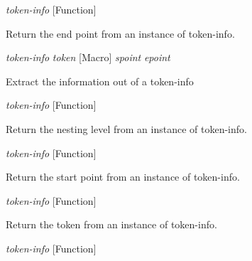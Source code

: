 \vspace{1em}
\noindent
{}
\usebox{\funcname}\emph{token-info}
 \hfill [Function]

\begin{doc-string}
Return the end point from an instance of token-info.
\end{doc-string}

\vspace{1em}
\noindent
{}
\usebox{\funcname}\emph{token-info} \emph{token}
 \hfill [Macro]
\hspace*{\wd\funcname}\emph{spoint} \emph{epoint}
\hspace*{\wd\funcname}

\begin{doc-string}
Extract the information out of a token-info
\end{doc-string}

\vspace{1em}
\noindent
{}
\usebox{\funcname}\emph{token-info}
 \hfill [Function]

\begin{doc-string}
Return the nesting level from an instance of token-info.
\end{doc-string}

\vspace{1em}
\noindent
{}
\usebox{\funcname}\emph{token-info}
 \hfill [Function]

\begin{doc-string}
Return the start point from an instance of token-info.
\end{doc-string}

\vspace{1em}
\noindent
{}
\usebox{\funcname}\emph{token-info}
 \hfill [Function]

\begin{doc-string}
Return the token from an instance of token-info.
\end{doc-string}

\vspace{1em}
\noindent
{}
\usebox{\funcname}\emph{token-info}
 \hfill [Function]

